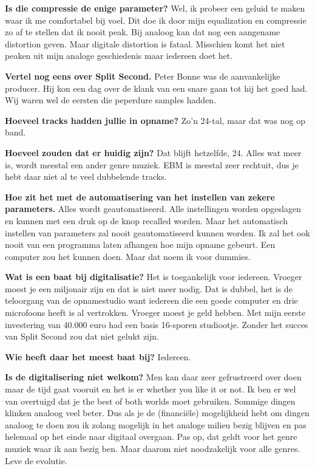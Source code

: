\textbf{Is die compressie de enige parameter?}\newline
Wel, ik probeer een geluid te maken waar ik me comfortabel bij voel.
Dit doe ik door mijn equalization en compressie zo af te stellen dat ik nooit peak. Bij analoog kan dat nog een aangename distortion geven.
Maar digitale distortion is fataal.
Misschien komt het niet peaken uit mijn analoge geschiedenis maar iedereen doet het.

\textbf{Vertel nog eens over Split Second.}\newline
Peter Bonne was de aanvankelijke producer. Hij kon een dag over de klank van een snare gaan tot hij het goed had.
Wij waren wel de eersten die peperdure samples hadden.

\textbf{Hoeveel tracks hadden jullie in opname?}\newline
Zo'n 24-tal, maar dat was nog op band.

\textbf{Hoeveel zouden dat er huidig zijn?}\newline
Dat blijft hetzelfde, 24. Alles wat meer is, wordt meestal een ander genre muziek.
EBM is meestal zeer rechtuit, dus je hebt daar niet al te veel dubbelende tracks.

\textbf{Hoe zit het met de automatisering van het instellen van zekere parameters.}\newline
Alles wordt geautomatiseerd. Alle instellingen worden opgeslagen en kunnen met een druk op de knop recalled worden.
Maar het automatisch instellen van parameters zal nooit geautomatiseerd kunnen worden. Ik zal het ook nooit van een programma laten afhangen hoe mijn opname gebeurt.
Een computer zou het kunnen doen. Maar dat noem ik voor dummies.

\textbf{Wat is een baat bij digitalisatie?}\newline
Het is toegankelijk voor iedereen. Vroeger moest je een miljonair zijn en dat is niet meer nodig.
Dat is dubbel, het is de teloorgang van de opnamestudio want iedereen die een goede computer en drie microfoons heeft is al vertrokken.
Vroeger moest je geld hebben. Met mijn eerste investering van 40.000 euro had een basis 16-sporen studiootje. Zonder het succes van Split Second zou dat niet gelukt zijn.

\textbf{Wie heeft daar het meest baat bij?}\newline
Iedereen.

\textbf{Is de digitalisering niet welkom?}\newline
Men kan daar zeer gefrustreerd over doen maar de tijd gaat vooruit en het is er whether you like it or not.
Ik ben er wel van overtuigd dat je the best of both worlds moet gebruiken.
Sommige dingen klinken analoog veel beter.
Dus als je de (financiële) mogelijkheid hebt om dingen analoog te doen zou ik zolang mogelijk in het analoge milieu bezig blijven en pas helemaal op het einde naar digitaal overgaan.
Pas op, dat geldt voor het genre muziek waar ik aan bezig ben. Maar daarom niet noodzakelijk voor alle genres.
Leve de evolutie.

